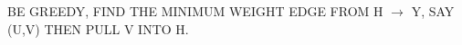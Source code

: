 \documentclass[preview]{standalone}
\begin{document}
\begin{center}
BE GREEDY, FIND THE MINIMUM WEIGHT EDGE FROM H $ \rightarrow $ Y, SAY (U,V) THEN PULL V INTO H.
\end{center}
\end{document}
